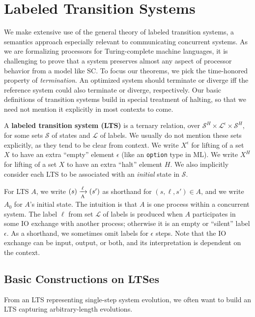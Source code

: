 \section{Labeled Transition Systems}\label{sec:lts}

We make extensive use of the general theory of labeled transition
systems, a semantics approach especially relevant to communicating
concurrent systems.  As we are formalizing processors for
Turing-complete machine languages, it is challenging to prove that a
system preserves almost any aspect of processor behavior from a model
like SC.  To focus our theorems, we pick the time-honored property of
\emph{termination}.  An optimized system should terminate or diverge
iff the reference system could also terminate or diverge,
respectively.  Our basic definitions of transition systems build in
special treatment of halting, so that we need not mention it
explicitly in most contexts to come.

\begin{defn}
A \textbf{labeled transition system (LTS)} is a ternary relation, over
$\mathcal S^H \times \mathcal L^\epsilon \times \mathcal S^H$, for some sets
$\mathcal S$ of states and $\mathcal L$ of labels. We usually do not mention
these sets explicitly, as they tend to be clear from context. We write
$X^\epsilon$ for lifting of a set $X$ to have an extra ``empty'' element
$\epsilon$ (like an \texttt{option} type in ML). We write $X^H$ for lifting of
a set $X$ to have an extra ``halt'' element $H$. We also implicitly consider
each LTS to be associated with an \emph{initial} state in $\mathcal S$.
\end{defn}

For LTS $A$, we write $\io{A}{s}{s'}{\ell}$ as shorthand for $(s,
\ell, s') \in A$, and we write $A_0$ for $A$'s initial state. The
intuition is that $A$ is one process within a concurrent system. The
label $\ell$ from set $\mathcal L$ of labels is produced when $A$
participates in some IO exchange with another process; otherwise it is
an empty or ``silent'' label $\epsilon$.  As a shorthand, we sometimes
omit labels for $\epsilon$ steps.  Note that the IO exchange can be
input, output, or both, and its interpretation is dependent on the
context.


\subsection{Basic Constructions on LTSes}

From an LTS representing single-step system evolution, we often want to build
an LTS capturing arbitrary-length evolutions.

